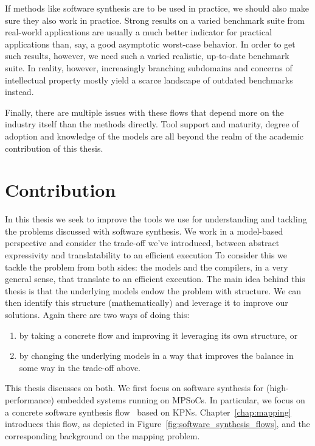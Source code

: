 If methods like software synthesis are to be used in practice, we should also make sure they also work in practice. 
Strong results on a varied benchmark suite from real-world applications are usually a much better indicator for practical applications than, say, a good asymptotic worst-case behavior.
In order to get such results, however, we need such a varied realistic, up-to-date benchmark suite.
In reality, however, increasingly branching subdomains and concerns of intellectual property mostly yield a scarce landscape of outdated benchmarks instead.

Finally, there are multiple issues with these flows that depend more on the industry itself than the methods directly.
Tool support and maturity, degree of adoption and knowledge of the models are all beyond the realm of the academic contribution of this thesis.

\section{Contribution}

In this thesis we seek to improve the tools we use for understanding and tackling the problems discussed with software synthesis. 
We work in a model-based perspective and consider the trade-off we've introduced, between abstract expressivity and translatability to an efficient execution
To consider this we tackle the problem from both sides: the models and the compilers, in a very general sense, that translate to an efficient execution.
The main idea behind this thesis is that the underlying models endow the problem with structure.
We can then identify this structure (mathematically) and leverage it to improve our solutions.
Again there are two ways of doing this: 
\begin{enumerate}
\item by taking a concrete flow and improving it leveraging its own structure, or
\item by changing the underlying models in a way that improves the balance in some way in the trade-off above.
\end{enumerate}
This thesis discusses on both.
We first focus on software synthesis for (high-performance) embedded systems running on \acp{MPSoC}.
In particular, we focus on a concrete software synthesis flow~\cite{maps,castrillon2014thesis} based on \acp{KPN}. 
Chapter~\ref{chap:mapping} introduces this flow, as depicted in Figure~\ref{fig:software_synthesis_flows}, and the corresponding background on the mapping problem.

